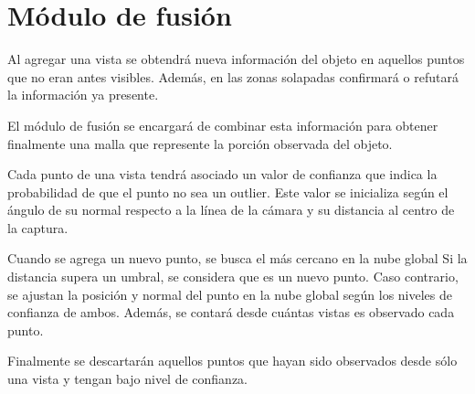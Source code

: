 \chapter{Módulo de fusión}
	Al agregar una vista se obtendrá nueva información del objeto en aquellos
	puntos que no eran antes visibles.
	Además, en las zonas solapadas confirmará o refutará la información ya presente.

	El módulo de fusión se encargará de combinar esta información para obtener
	finalmente una malla que represente la porción observada del objeto.

	Cada punto de una vista tendrá asociado un valor de confianza que indica la
	probabilidad de que el punto no sea un outlier.
	Este valor se inicializa según el ángulo de su normal respecto a la línea
	de la cámara y su distancia al centro de la captura.

	Cuando se agrega un nuevo punto, se busca el más cercano en la nube global
	Si la distancia supera un umbral, se considera que es un nuevo punto. Caso
	contrario, se ajustan la posición y normal del punto en la nube global
	según los niveles de confianza de ambos.  Además, se contará desde cuántas
	vistas es observado cada punto.


	Finalmente se descartarán aquellos puntos que hayan sido observados desde sólo una vista y tengan bajo nivel de confianza.




